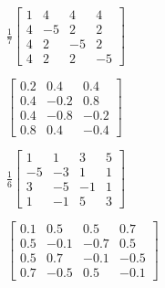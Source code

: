 \begin{exercise}
\begin{parts}
\item \(\frac17\begin{bmatrix} 1&4&4&4
\\4&-5&2&2
\\4&2&-5&2
\\4&2&2&-5 \end{bmatrix}\)

\item \(\begin{bmatrix} 0.2&0.4&0.4
\\0.4&-0.2&0.8
\\0.4&-0.8&-0.2
\\0.8&0.4&-0.4 \end{bmatrix}\)

\item \(\frac16\begin{bmatrix} 1&1&3&5
\\-5&-3&1&1
\\3&-5&-1&1
\\1&-1&5&3 \end{bmatrix}\)

\item \(\begin{bmatrix} 0.1&0.5&0.5&0.7
\\0.5&-0.1&-0.7&0.5
\\0.5&0.7&-0.1&-0.5
\\0.7&-0.5&0.5&-0.1 \end{bmatrix}\)

\end{parts}
\end{exercise}


